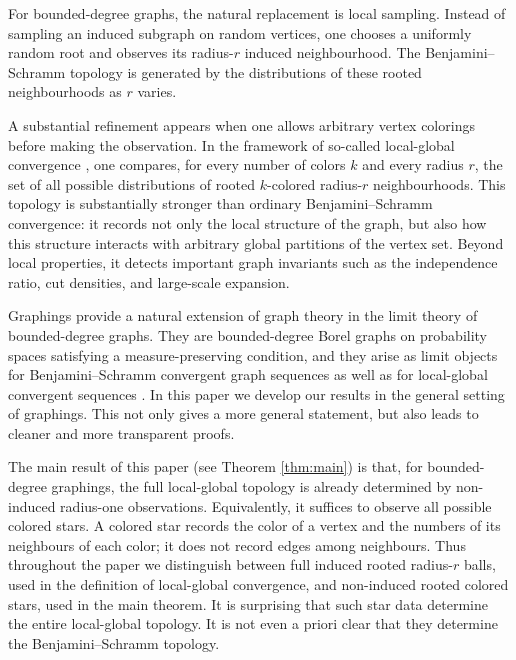 \documentclass[11pt]{amsart}
\theoremstyle{remark}
\begin{document}
For bounded-degree graphs, the natural replacement is local sampling.  Instead of sampling an induced subgraph on random vertices, one chooses a uniformly random root and observes its radius-$r$ induced neighbourhood.  The Benjamini--Schramm \cite{BS} topology is generated by the distributions of these rooted neighbourhoods as $r$ varies.

A substantial refinement appears when one allows arbitrary vertex colorings before making the observation. In the framework of so-called local-global convergence \cite{BR,HLSz,NesetrilOssonaLocalGlobal}, one compares, for every number of colors $k$ and every radius $r$, the set of all possible distributions of rooted $k$-colored radius-$r$ neighbourhoods. This topology is substantially stronger than ordinary Benjamini--Schramm convergence: it records not only the local structure of the graph, but also how this structure interacts with arbitrary global partitions of the vertex set. Beyond local properties, it detects important graph invariants such as the independence ratio, cut densities, and large-scale expansion.

Graphings \cite{Levitt,L,HLSz} provide a natural extension of graph theory in the limit theory of bounded-degree graphs. They are bounded-degree Borel graphs on probability spaces satisfying a measure-preserving condition, and they arise as limit objects for Benjamini--Schramm convergent graph sequences \cite{ElekGraphings} as well as for local-global convergent sequences \cite{HLSz}. In this paper we develop our results in the general setting of graphings. This not only gives a more general statement, but also leads to cleaner and more transparent proofs.

The main result of this paper (see Theorem \ref{thm:main}) is that, for bounded-degree graphings, the full local-global topology is already determined by non-induced radius-one observations.  Equivalently, it suffices to observe all possible colored stars.  A colored star records the color of a vertex and the numbers of its neighbours of each color; it does not record edges among neighbours.  Thus throughout the paper we distinguish between full induced rooted radius-$r$ balls, used in the definition of local-global convergence, and non-induced rooted colored stars, used in the main theorem. It is surprising that such star data determine the entire local-global topology. It is not even a priori clear that they determine the Benjamini--Schramm topology. 
\end{document}
